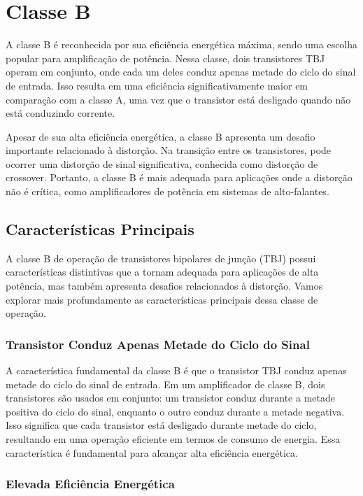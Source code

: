 \section{Classe B}

A classe B é reconhecida por sua eficiência energética máxima, sendo uma escolha popular para amplificação de potência. Nessa classe, dois transistores TBJ operam em conjunto, onde cada um deles conduz apenas metade do ciclo do sinal de entrada. Isso resulta em uma eficiência significativamente maior em comparação com a classe A, uma vez que o transistor está desligado quando não está conduzindo corrente.

Apesar de sua alta eficiência energética, a classe B apresenta um desafio importante relacionado à distorção. Na transição entre os transistores, pode ocorrer uma distorção de sinal significativa, conhecida como distorção de crossover. Portanto, a classe B é mais adequada para aplicações onde a distorção não é crítica, como amplificadores de potência em sistemas de alto-falantes.

\subsection{Características Principais}

A classe B de operação de transistores bipolares de junção (TBJ) possui características distintivas que a tornam adequada para aplicações de alta potência, mas também apresenta desafios relacionados à distorção. Vamos explorar mais profundamente as características principais dessa classe de operação.

\subsubsection{Transistor Conduz Apenas Metade do Ciclo do Sinal}

A característica fundamental da classe B é que o transistor TBJ conduz apenas metade do ciclo do sinal de entrada. Em um amplificador de classe B, dois transistores são usados em conjunto: um transistor conduz durante a metade positiva do ciclo do sinal, enquanto o outro conduz durante a metade negativa. Isso significa que cada transistor está desligado durante metade do ciclo, resultando em uma operação eficiente em termos de consumo de energia. Essa característica é fundamental para alcançar alta eficiência energética.

\subsubsection{Elevada Eficiência Energética}

